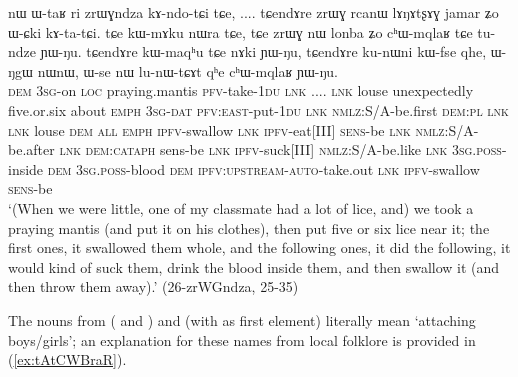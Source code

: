 \begin{exe}
\ex \label{ex:zrWGndza}
\gll nɯ ɯ-taʁ ri zrɯɣndza kɤ-ndo-tɕi tɕe, .... tɕendɤre zrɯɣ rcanɯ lɤŋɤtʂɤɣ jamar ʑo ɯ-ɕki kɤ-ta-tɕi. tɕe kɯ-mɤku nɯra tɕe, tɕe zrɯɣ nɯ lonba ʑo cʰɯ-mqlaʁ tɕe tu-ndze ɲɯ-ŋu. tɕendɤre kɯ-maqʰu tɕe nɤki ɲɯ-ŋu,  tɕendɤre ku-nɯni kɯ-fse qhe, ɯ-ŋgɯ nɯnɯ,  ɯ-se nɯ lu-nɯ-tɕɤt qʰe cʰɯ-mqlaʁ ɲɯ-ŋu. \\
\textsc{dem} \textsc{3sg}-on \textsc{loc} praying.mantis \textsc{pfv}-take-\textsc{1du} \textsc{lnk} .... \textsc{lnk} louse unexpectedly five.or.six about \textsc{emph} \textsc{3sg}-\textsc{dat} \textsc{pfv}:\textsc{east}-put-\textsc{1du} \textsc{lnk} \textsc{nmlz}:S/A-be.first \textsc{dem:pl} \textsc{lnk} \textsc{lnk} louse \textsc{dem} \textsc{all} \textsc{emph} \textsc{ipfv}-swallow \textsc{lnk} \textsc{ipfv}-eat[III] \textsc{sens}-be \textsc{lnk} \textsc{nmlz}:S/A-be.after \textsc{lnk} \textsc{dem}:\textsc{cataph} sens-be \textsc{lnk} \textsc{ipfv}-suck[III] \textsc{nmlz}:S/A-be.like \textsc{lnk} \textsc{3sg.poss}-inside \textsc{dem} \textsc{3sg.poss}-blood \textsc{dem} \textsc{ipfv}:\textsc{upstream}-\textsc{auto}-take.out \textsc{lnk}  \textsc{ipfv}-swallow \textsc{sens}-be \\
\glt `(When we were little, one of my classmate had a lot of lice, and) we took a praying mantis (and put it on his clothes), then put five or six lice near it; the first ones, it swallowed them whole, and the following ones,  it did the following, it would kind of suck them, drink the blood inside them, and then swallow it (and then throw them away).' (26-zrWGndza, 25-35)
\end{exe}

The nouns  from ( and ) and   (with  as first element) literally mean `attaching boys/girls'; an explanation for these names from local folklore is provided in (\ref{ex:tAtCWBraR}).

